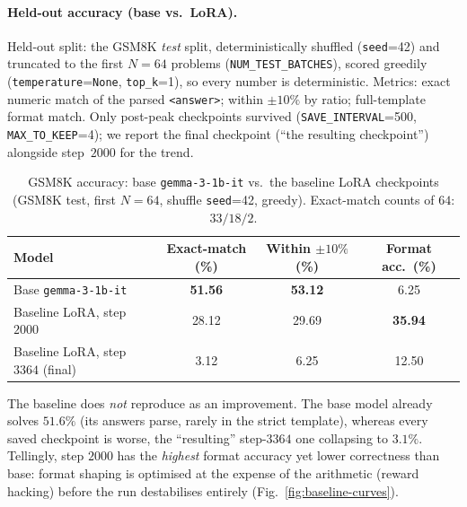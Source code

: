\documentclass[11pt,a4paper]{article}
\begin{document}
\paragraph{Held-out accuracy (base vs.\ LoRA).}
Held-out split: the GSM8K \emph{test} split, deterministically shuffled
(\texttt{seed}{=}42) and truncated to the first $N{=}64$ problems
(\texttt{NUM\_TEST\_BATCHES}), scored greedily (\texttt{temperature}{=}\texttt{None},
\texttt{top\_k}{=}1), so every number is deterministic. Metrics: exact numeric
match of the parsed \texttt{<answer>}; within $\pm10\%$ by ratio; full-template
format match. Only post-peak checkpoints survived (\texttt{SAVE\_INTERVAL}{=}500,
\texttt{MAX\_TO\_KEEP}{=}4); we report the final checkpoint (``the resulting
checkpoint'') alongside step~$2000$ for the trend.
\begin{table}[h]
  \centering
  \caption{GSM8K accuracy: base \texttt{gemma-3-1b-it} vs.\ the baseline LoRA
  checkpoints (GSM8K test, first $N{=}64$, shuffle \texttt{seed}{=}42, greedy).
  Exact-match counts of $64$: $33/18/2$.}
  \label{tab:baseline-acc}
  \small
  \begin{tabular}{lccc}
    \toprule
    Model & Exact-match (\%) & Within $\pm10\%$ (\%) & Format acc.\ (\%) \\
    \midrule
    Base \texttt{gemma-3-1b-it}              & \textbf{51.56} & \textbf{53.12} & 6.25 \\
    Baseline LoRA, step $2000$               & 28.12 & 29.69 & \textbf{35.94} \\
    Baseline LoRA, step $3364$ (final)       & 3.12  & 6.25  & 12.50 \\
    \bottomrule
  \end{tabular}
\end{table}

\noindent The baseline does \emph{not} reproduce as an improvement. The base
model already solves $51.6\%$ (its answers parse, rarely in the strict template),
whereas every saved checkpoint is worse, the ``resulting'' step-$3364$ one
collapsing to $3.1\%$. Tellingly, step $2000$ has the \emph{highest} format
accuracy yet lower correctness than base: format shaping is optimised at the
expense of the arithmetic (reward hacking) before the run destabilises entirely
(Fig.~\ref{fig:baseline-curves}).
\end{document}
